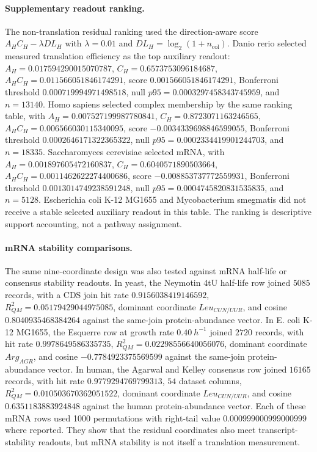 \paragraph{Supplementary readout ranking.}
The non-translation residual ranking used the direction-aware score $A_H C_H-\lambda DL_H$ with $\lambda=0.01$ and $DL_H=\log_2(1+n_{\mathrm{col}})$.  Danio rerio selected measured translation efficiency as the top auxiliary readout: $A_H=0.017594290015070787$, $C_H=0.6573753096184687$, $A_HC_H=0.011566051846174291$, score $0.001566051846174291$, Bonferroni threshold $0.000719994971498518$, null $p95=0.0003297458343745959$, and $n=13140$.  Homo sapiens selected complex membership by the same ranking table, with $A_H=0.007527199987780841$, $C_H=0.8723071163246565$, $A_HC_H=0.006566030115340095$, score $-0.0034339698846599055$, Bonferroni threshold $0.0002646171322365322$, null $p95=0.0002334419901244703$, and $n=18335$.  Saccharomyces cerevisiae selected mRNA, with $A_H=0.001897605472160837$, $C_H=0.6040571890503664$, $A_HC_H=0.0011462622274400686$, score $-0.008853737772559931$, Bonferroni threshold $0.0013014749238591248$, null $p95=0.0004745820831535835$, and $n=5128$.  Escherichia coli K-12 MG1655 and Mycobacterium smegmatis did not receive a stable selected auxiliary readout in this table.  The ranking is descriptive support accounting, not a pathway assignment.

\paragraph{mRNA stability comparisons.}
The same nine-coordinate design was also tested against mRNA half-life or consensus stability readouts.  In yeast, the Neymotin 4tU half-life row joined $5085$ records, with a CDS join hit rate $0.9156038419146592$, $R^2_{QM}=0.05179429044975085$, dominant coordinate $Leu_{CUN/UUR}$, and cosine $0.8040935468384264$ against the same-join protein-abundance vector.  In E. coli K-12 MG1655, the Esquerre row at growth rate $0.40\ h^{-1}$ joined $2720$ records, with hit rate $0.9978649586335735$, $R^2_{QM}=0.02298556640056076$, dominant coordinate $Arg_{AGR}$, and cosine $-0.7784923375569599$ against the same-join protein-abundance vector.  In human, the Agarwal and Kelley consensus row joined $16165$ records, with hit rate $0.9779294769799313$, $54$ dataset columns, $R^2_{QM}=0.010503670362051522$, dominant coordinate $Leu_{CUN/UUR}$, and cosine $0.6351183883924848$ against the human protein-abundance vector.  Each of these mRNA rows used 1000 permutations with right-tail value $0.000999000999000999$ where reported.  They show that the residual coordinates also meet transcript-stability readouts, but mRNA stability is not itself a translation measurement.


